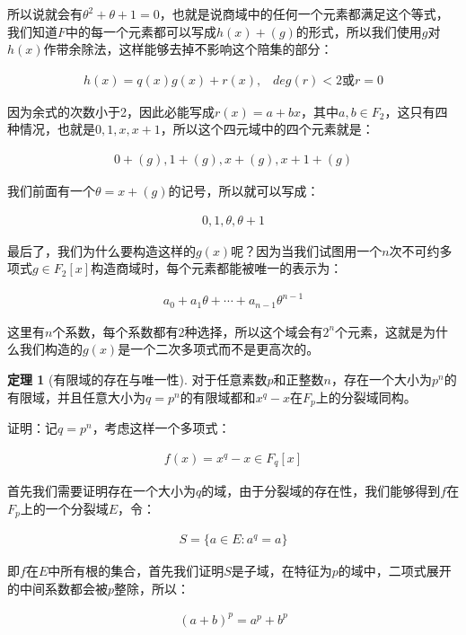 \documentclass[12pt, a4paper, oneside]{ctexart}
\theoremstyle{definition}
\newtheorem*{theorem}{定理}
\begin{document}
所以说就会有$\theta^2+\theta+1=0$，也就是说商域中的任何一个元素都满足这个等式，我们知道$F$中的每一个元素都可以写成$h(x)+(g)$的形式，所以我们使用$g$对$h(x)$作带余除法，这样能够去掉不影响这个陪集的部分：

\begin{align*}
h(x)=q(x)g(x)+r(x),\;\;\; deg(r)<2\mbox{或}r=0
\end{align*}

因为余式的次数小于2，因此必能写成$r(x)=a+bx$，其中$a,b\in F_2$，这只有四种情况，也就是$0,1,x,x+1$，所以这个四元域中的四个元素就是：

\begin{align*}
0+(g),1+(g),x+(g),x+1+(g)
\end{align*}

我们前面有一个$\theta=x+(g)$的记号，所以就可以写成：

\begin{align*}
0,1,\theta,\theta+1
\end{align*}

最后了，我们为什么要构造这样的$g(x)$呢？因为当我们试图用一个$n$次不可约多项式$g\in F_2[x]$构造商域时，每个元素都能被唯一的表示为：

\begin{align*}
a_0+a_1\theta+\cdots+a_{n-1}\theta^{n-1}
\end{align*}

这里有$n$个系数，每个系数都有2种选择，所以这个域会有$2^n$个元素，这就是为什么我们构造的$g(x)$是一个二次多项式而不是更高次的。

\begin{theorem}[有限域的存在与唯一性]
对于任意素数$p$和正整数$n$，存在一个大小为$p^n$的有限域，并且任意大小为$q=p^n$的有限域都和$x^q-x$在$F_p$上的分裂域同构。
\end{theorem}

证明：记$q=p^n$，考虑这样一个多项式：

\begin{align*}
f(x)=x^q-x\in F_q[x]
\end{align*}

首先我们需要证明存在一个大小为$q$的域，由于分裂域的存在性，我们能够得到$f$在$F_p$上的一个分裂域$E$，令：

\begin{align*}
S=\{a\in E: a^q=a\}
\end{align*}

即$f$在$E$中所有根的集合，首先我们证明$S$是子域，在特征为$p$的域中，二项式展开的中间系数都会被$p$整除，所以：

\begin{align*}
(a+b)^p=a^p+b^p
\end{align*}
\end{document}
